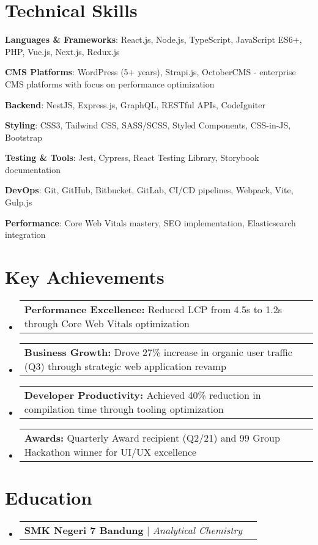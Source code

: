 \documentclass[a4paper, 11pt]{article}
\makeatletter
\newcommand{\resumeProjectHeading}[2]{
    \item
    \begin{tabular*}{0.987\textwidth}{l@{\extracolsep{\fill}}r}
      \small#1\\
    \end{tabular*}\vspace{-7pt}
}
\newcommand{\resumeSubHeadingListStart}{\begin{itemize}[leftmargin=0.1in, label={}]}
\newcommand{\resumeSubHeadingListEnd}{\end{itemize}\vspace{5pt}}
\makeatother
\begin{document}
\section{Technical Skills}
    \resumeSubHeadingListStart
        \small{
            \item \textbf{Languages \& Frameworks}: React.js, Node.js, TypeScript, JavaScript ES6+, PHP, Vue.js, Next.js, Redux.js
            \item \textbf{CMS Platforms}: WordPress (5+ years), Strapi.js, OctoberCMS - enterprise CMS platforms with focus on performance optimization
            \item \textbf{Backend}: NestJS, Express.js, GraphQL, RESTful APIs, CodeIgniter
            \item \textbf{Styling}: CSS3, Tailwind CSS, SASS/SCSS, Styled Components, CSS-in-JS, Bootstrap
            \item \textbf{Testing \& Tools}: Jest, Cypress, React Testing Library, Storybook documentation
            \item \textbf{DevOps}: Git, GitHub, Bitbucket, GitLab, CI/CD pipelines, Webpack, Vite, Gulp.js
            \item \textbf{Performance}: Core Web Vitals mastery, SEO implementation, Elasticsearch integration
        }
    \resumeSubHeadingListEnd

\section{Key Achievements}
    \resumeSubHeadingListStart
        \resumeProjectHeading
            {\textbf{Performance Excellence:} Reduced LCP from 4.5s to 1.2s through Core Web Vitals optimization}{}
        \resumeProjectHeading
            {\textbf{Business Growth:} Drove 27\% increase in organic user traffic (Q3) through strategic web application revamp}{}
        \resumeProjectHeading
            {\textbf{Developer Productivity:} Achieved 40\% reduction in compilation time through tooling optimization}{}
        \resumeProjectHeading
            {\textbf{Awards:} Quarterly Award recipient (Q2/21) and 99 Group Hackathon winner for UI/UX excellence}{}
    \resumeSubHeadingListEnd

\section{Education}
    \resumeSubHeadingListStart
        \resumeProjectHeading
            {\textbf{SMK Negeri 7 Bandung} $|$ \emph{Analytical Chemistry}}{2009 -- 2011}
    \resumeSubHeadingListEnd
\end{document}

